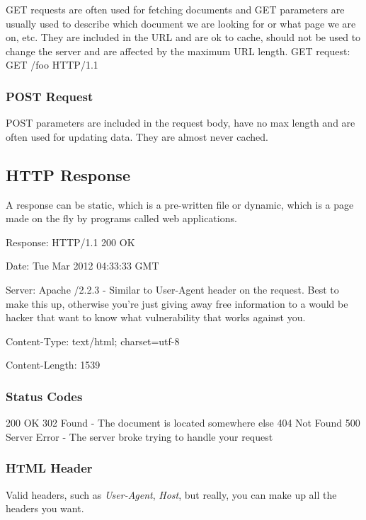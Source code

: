 \documentclass[12pt]{article}
\begin{document}
GET requests are often used for fetching documents and GET parameters are usually used to describe which document we are looking for or what page we are on, etc. They are included in the URL and are ok to cache, should not be used to change the server and are affected by the maximum URL length.
GET request: GET /foo HTTP/1.1

\subsubsection{POST Request}

POST parameters are included in the request body, have no max length and are often used for updating data. They are almost never cached.

\subsection{HTTP Response}
A response can be static, which is a pre-written file or dynamic, which is a page made on the fly by programs called web applications.

\begin{list}{*}{
\setlength{\itemsep}{0pt}
\setlength{\parsep}{0pt}
\setlength{\topsep}{0pt}
\setlength{\partopsep}{0pt}
\setlength{\leftmargin}{2em}
\setlength{\labelwidth}{1.5em}
\setlength{\labelsep}{0.5em}
}
\item Response: HTTP/1.1 200 OK
\item Date: Tue Mar 2012 04:33:33 GMT
\item Server: Apache /2.2.3 - Similar to User-Agent header on the request. Best to make this up, otherwise you're just giving away free information to a would be hacker that want to know what vulnerability that works against you.
\item Content-Type: text/html; charset=utf-8
\item Content-Length: 1539
\end{list}

\subsubsection*{Status Codes}
200 OK
302 Found - The document is located somewhere else
404 Not Found
500 Server Error - The server broke trying to handle your request

\subsubsection*{HTML Header}
Valid headers, such as \emph{User-Agent}, \emph{Host}, but really, you can make up all the headers you want.
\end{document}
